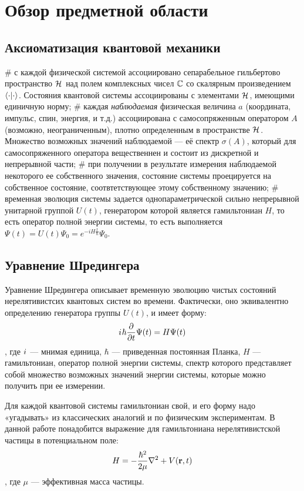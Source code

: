 \chapter{Обзор предметной области}
\label{chapter1}

\section{Аксиоматизация квантовой механики}
\begin{easylist}[itemize]
# с каждой физической системой ассоциировано сепарабельное гильбертово пространство $\mathcal{H}_{}$ над полем комплексных чисел $\mathbb{C}$ со скалярным произведением $\ipcdot$. Состояния квантовой системы ассоциированы с элементами $\mathcal{H}_{}$, имеющими единичную норму;
# каждая \textit{наблюдаемая} физическая величина $a$ (координата, импульс, спин, энергия, и т.д.) ассоциирована с самосопряженным оператором $A$ (возможно, неограниченным), плотно определенным в пространстве $\mathcal{H}_{}$. Множество возможных значений наблюдаемой — её спектр $\sigma(A)$, который для самосопряженного оператора вещественнен и состоит из дискретной и непрерывной части;
# при получении в результате измерения наблюдаемой некоторого ее собственного значения, состояние системы проецируется на собственное состояние, соотвтетствующее этому собственному значению;
# временная эволюция системы задается однопараметрической сильно непрерывной унитарной группой $U(t)$, генератором которой является гамильтониан $H$, то есть оператор полной энергии системы, то есть выполняется $\Psi(t) = U(t) \Psi_0 = e^{-i H \frac{t}{\hbar}} \Psi_0$.
\end{easylist}

\section{Уравнение Шредингера}
Уравнение Шредингера описывает временную эволюцию чистых состояний нерелятивистсих квантовых систем во времени. Фактически, оно эквивалентно определению генератора группы $U(t)$, и имеет форму:
\[
{i\mkern1mu} \hbar \pdv{t} \Psi(t) = H \Psi(t)
\]
, где ${i\mkern1mu}$ — мнимая единица, $\hbar$ — приведенная постоянная Планка, $H$ — гамильтониан, оператор полной энергии системы, спектр которого представляет собой множество возможных значений энергии системы, которые можно получить при ее измерении.

Для каждой квантовой системы гамильтониан свой, и его форму надо «угадывать» из классических аналогий и по физическим экспериментам. В данной работе понадобится выражение для гамильтониана нерелятивистской частицы в потенциальном поле:
\[
H = - \frac{\hbar^2}{2 \mu} \laplacian + V(\vb{r}, t)
\],
где $\mu$ — эффективная масса частицы.

